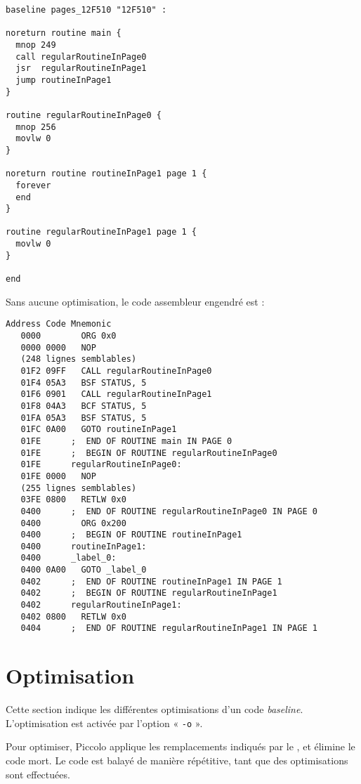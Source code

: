 \begin{lstlisting}[language=piccolo]
baseline pages_12F510 "12F510" :

noreturn routine main {
  mnop 249
  call regularRoutineInPage0
  jsr  regularRoutineInPage1
  jump routineInPage1
}

routine regularRoutineInPage0 {
  mnop 256
  movlw 0
}

noreturn routine routineInPage1 page 1 {
  forever
  end
}

routine regularRoutineInPage1 page 1 {
  movlw 0
}

end
\end{lstlisting}

Sans aucune optimisation, le code assembleur engendré est :

\begin{lstlisting}[language=assembleur]
Address Code Mnemonic
   0000        ORG 0x0
   0000 0000   NOP
   (248 lignes semblables)
   01F2 09FF   CALL regularRoutineInPage0
   01F4 05A3   BSF STATUS, 5
   01F6 0901   CALL regularRoutineInPage1
   01F8 04A3   BCF STATUS, 5
   01FA 05A3   BSF STATUS, 5
   01FC 0A00   GOTO routineInPage1
   01FE      ;  END OF ROUTINE main IN PAGE 0
   01FE      ;  BEGIN OF ROUTINE regularRoutineInPage0
   01FE      regularRoutineInPage0:
   01FE 0000   NOP
   (255 lignes semblables)
   03FE 0800   RETLW 0x0
   0400      ;  END OF ROUTINE regularRoutineInPage0 IN PAGE 0
   0400        ORG 0x200
   0400      ;  BEGIN OF ROUTINE routineInPage1
   0400      routineInPage1:
   0400      _label_0:
   0400 0A00   GOTO _label_0
   0402      ;  END OF ROUTINE routineInPage1 IN PAGE 1
   0402      ;  BEGIN OF ROUTINE regularRoutineInPage1
   0402      regularRoutineInPage1:
   0402 0800   RETLW 0x0
   0404      ;  END OF ROUTINE regularRoutineInPage1 IN PAGE 1
\end{lstlisting}








\section{Optimisation}

Cette section indique les différentes optimisations d'un code \emph{baseline}. L'optimisation est activée par l'option « \texttt{-o} ».

Pour optimiser, Piccolo applique les remplacements indiqués par le , et élimine le code mort. Le code est balayé de manière répétitive, tant que des optimisations sont effectuées.

